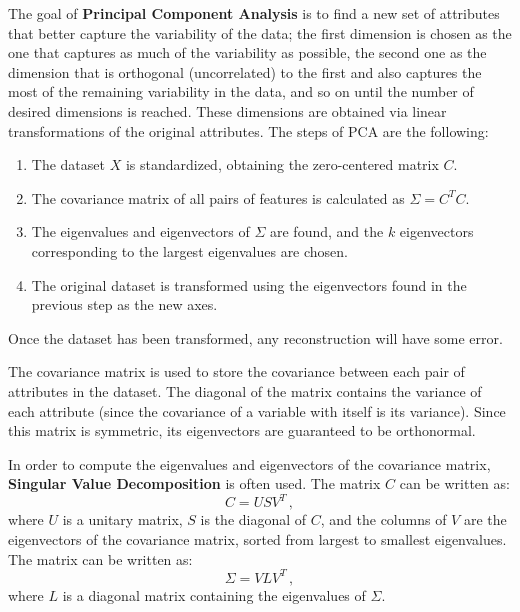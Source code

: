 The goal of \textbf{Principal Component Analysis} is to find a new set of attributes that better capture the variability of the data; the first dimension is chosen as the one that captures as much of the variability as possible, the second one as the dimension that is orthogonal (uncorrelated) to the first and also captures the most of the remaining variability in the data, and so on until the number of desired dimensions is reached. These dimensions are obtained via linear transformations of the original attributes. The steps of PCA are the following:
\begin{enumerate}
    \item The dataset $X$ is standardized, obtaining the zero-centered matrix $C$.
        
    \item The covariance matrix of all pairs of features is calculated as $\Sigma = C^TC$.
    
    \item The eigenvalues and eigenvectors of $\Sigma$ are found, and the $k$ eigenvectors corresponding to the largest eigenvalues are chosen.
    
    \item The original dataset is transformed using the eigenvectors found in the previous step as the new axes.
\end{enumerate}
Once the dataset has been transformed, any reconstruction will have some error.

The covariance matrix is used to store the covariance between each pair of attributes in the dataset. The diagonal of the matrix contains the variance of each attribute (since the covariance of a variable with itself is its variance). Since this matrix is symmetric, its eigenvectors are guaranteed to be orthonormal.

In order to compute the eigenvalues and eigenvectors of the covariance matrix, \textbf{Singular Value Decomposition} is often used. The matrix $C$ can be written as:
\begin{equation*}
    C = U S V^T \,,
\end{equation*}
where $U$ is a unitary matrix, $S$ is the diagonal of $C$, and the columns of $V$ are the eigenvectors of the covariance matrix, sorted from largest to smallest eigenvalues. The matrix can be written as:
\begin{equation*}
    \Sigma = V L V^T \,,
\end{equation*}
where $L$ is a diagonal matrix containing the eigenvalues of $\Sigma$.

